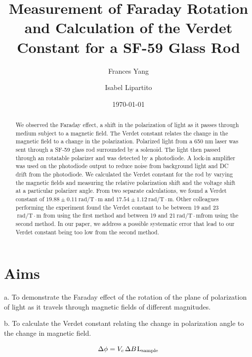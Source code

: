 \documentclass[prb,preprint]{revtex4-1}
\begin{document}
\title{Measurement of Faraday Rotation and Calculation of the Verdet Constant for a SF-59 Glass Rod}

\author{Frances Yang}

\author{Isabel Lipartito}

\date{\today}

\begin{abstract}
{We observed the Faraday effect, a shift in the polarization of light as it passes through medium subject to a magnetic field. The Verdet constant relates the change in the magnetic field to a change in the polarization.  Polarized light from a 650 nm laser was sent through a SF-59 glass rod surrounded by a solenoid. The light then passed through an rotatable polarizer and was detected by a photodiode. A lock-in amplifier was used on the photodiode output to reduce noise from background light and DC drift from the photodiode. We calculated the Verdet constant for the rod by varying the magnetic fields and measuring the relative polarization shift and the voltage shift at a particular polarizer angle. From two separate calculations, we found a Verdet constant of $19.88 \pm 0.11 \mathrm{~rad/T} \cdot \textrm{m}$ and $17.54 \pm 1.12 \mathrm{~rad/T} \cdot \textrm{m}$. Other colleagues performing the experiment found the Verdet constant to be between 19 and 23$\mathrm{~rad/T} \cdot \textrm{m}$ from using the first method and between 19 and 21$\mathrm{~rad/T} \cdot \textrm{m} $from using the second method.  In our paper, we address a possible systematic error that lead to our Verdet constant being too low from the second method.

}
\end{abstract}

\maketitle 
\section{Aims}
{a.  To demonstrate the Faraday effect of the rotation of the plane of polarization of light as it travels through magnetic fields of different magnitudes.

b.  To calculate the Verdet constant relating the change in polarization angle to the change in magnetic field.}
\begin{equation}
\Delta \phi =V_{c}\hspace{1.5pt} \Delta B\hspace{1pt}\textrm{L}{_{\textrm{sample}}}
\end{equation}
\end{document}
